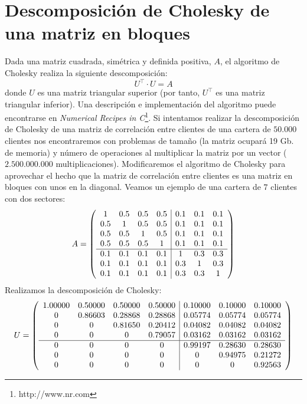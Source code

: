 
\section{Descomposici\'on de Cholesky de una matriz en bloques}
\label{apendix:cholblock}

Dada una matriz cuadrada, sim\'etrica y definida positiva, $A$, el algoritmo
de Cholesky realiza la siguiente descomposici\'on:
\begin{displaymath}
U^{\top} \cdot U = A
\end{displaymath}
donde $U$ es una matriz triangular superior (por tanto, $U^{\top}$ es una matriz
triangular inferior). Una descripci\'on e implementaci\'on del algoritmo puede
encontrarse en \emph{Numerical Recipes in C}\footnote{http://www.nr.com}.
\newline
\newline
Si intentamos realizar la descomposici\'on de Cholesky de una matriz de correlaci\'on
entre clientes de una cartera de $50.000$ clientes nos encontraremos con problemas
de tama\~no (la matriz ocupar\'a 19 Gb. de memoria) y n\'umero de operaciones al
multiplicar la matriz por un vector ($2.500.000.000$ multiplicaciones).
\newline
\newline
Modificaremos el algoritmo de Cholesky para aprovechar el hecho que la matriz
de correlaci\'on entre clientes es una matriz en bloques con unos en la diagonal.
Veamos un ejemplo de una cartera de $7$ clientes con dos sectores:
\begin{displaymath}
A = \left(
\begin{array}{cccc|ccc}
1   & 0.5 & 0.5 & 0.5 & 0.1 & 0.1 & 0.1 \cr
0.5 & 1   & 0.5 & 0.5 & 0.1 & 0.1 & 0.1 \cr
0.5 & 0.5 & 1   & 0.5 & 0.1 & 0.1 & 0.1 \cr
0.5 & 0.5 & 0.5 & 1   & 0.1 & 0.1 & 0.1 \cr
\hline
0.1 & 0.1 & 0.1 & 0.1 & 1   & 0.3 & 0.3 \cr
0.1 & 0.1 & 0.1 & 0.1 & 0.3 & 1   & 0.3 \cr
0.1 & 0.1 & 0.1 & 0.1 & 0.3 & 0.3 & 1
\end{array}
\right)
\end{displaymath}
Realizamos la descomposici\'on de Cholesky:
\begin{displaymath}
U = \left(
\begin{array}{cccc|ccc}
 1.00000 & 0.50000 & 0.50000 & 0.50000 & 0.10000 & 0.10000 & 0.10000 \cr
 0       & 0.86603 & 0.28868 & 0.28868 & 0.05774 & 0.05774 & 0.05774 \cr
 0       & 0       & 0.81650 & 0.20412 & 0.04082 & 0.04082 & 0.04082 \cr
 0       & 0       & 0       & 0.79057 & 0.03162 & 0.03162 & 0.03162 \cr
\hline
 0       & 0       & 0       & 0       & 0.99197 & 0.28630 & 0.28630 \cr
 0       & 0       & 0       & 0       & 0       & 0.94975 & 0.21272 \cr
 0       & 0       & 0       & 0       & 0       & 0       & 0.92563
\end{array}
\right)
\end{displaymath}
